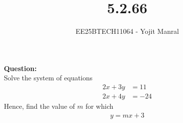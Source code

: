 \documentclass[journal]{IEEEtran}
\begin{document}

\vspace{3cm}

\title{5.2.66}
\author{EE25BTECH11064 - Yojit Manral}

\maketitle
{\let\newpage\relax\maketitle}
\renewcommand{\thefigure}{\theenumi}
\renewcommand{\thetable}{\theenumi}
\setlength{\intextsep}{10pt} %

\textbf{Question:}\\
Solve the system of equations
\begin{align}
    2x + 3y &= 11 \\
    2x + 4y &= -24
\end{align}
Hence, find the value of $m$ for which
\begin{align}
    y = mx + 3
\end{align}
\end{document}
